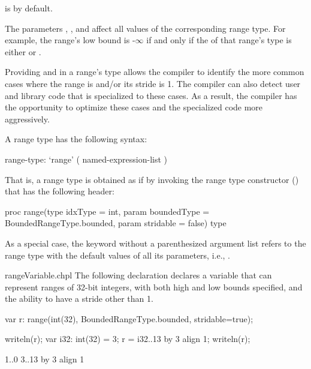 \noindent {} is  by default.

The parameters , , and 
affect all values of the corresponding range type.
For example, the range's low bound is -$\infty$ if and only if
the  of that range's type is either 
or .

\begin{rationale}
Providing  and  in a range's type
allows the compiler to identify the more common cases
where the range is  and/or its stride is 1.
The compiler can also detect user and library code that is
specialized to these cases.
As a result, the compiler has the opportunity to optimize these
cases and the specialized code more aggressively.
\end{rationale}


A range type has the following syntax:
\begin{syntax}
range-type:
  `range' ( named-expression-list )
\end{syntax}

That is, a range type is obtained as if by invoking the range type constructor
() that has the following header:

\begin{chapel}
  proc range(type idxType = int,
             param boundedType = BoundedRangeType.bounded,
             param stridable = false) type
\end{chapel}

As a special case, the keyword  without a parenthesized
argument list refers to the range type with the default values
of all its parameters, i.e.,
.

\begin{chapelexample}{rangeVariable.chpl}
The following declaration declares a variable 
that can represent ranges of 32-bit integers,
with both high and low bounds specified,
and the ability to have a stride other than 1.
\begin{chapel}
var r: range(int(32), BoundedRangeType.bounded, stridable=true);
\end{chapel}
\begin{chapelpost}
writeln(r);
var i32: int(32) = 3;
r = i32..13 by 3 align 1;
writeln(r);
\end{chapelpost}
\begin{chapeloutput}
1..0
3..13 by 3 align 1
\end{chapeloutput}
\end{chapelexample}


